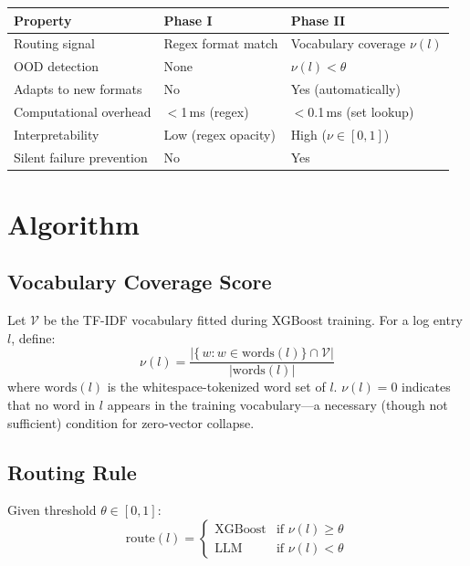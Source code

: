 \documentclass[11pt,conference]{IEEEtran}
\begin{document}
\begin{center}
\begin{tabular}{@{}lll@{}}
\toprule
\textbf{Property} & \textbf{Phase I} & \textbf{Phase II} \\
\midrule
Routing signal & Regex format match & Vocabulary coverage $\nu(l)$ \\
OOD detection & None & $\nu(l) < \theta$ \\
Adapts to new formats & No & Yes (automatically) \\
Computational overhead & $<$1\,ms (regex) & $<$0.1\,ms (set lookup) \\
Interpretability & Low (regex opacity) & High ($\nu \in [0,1]$) \\
Silent failure prevention & No & Yes \\
\bottomrule
\end{tabular}
\end{center}

\section{Algorithm}

\subsection{Vocabulary Coverage Score}

Let $\mathcal{V}$ be the TF-IDF vocabulary fitted during XGBoost training.
For a log entry $l$, define:
\begin{equation}
\nu(l) = \frac{|\{\,w : w \in \text{words}(l)\} \cap \mathcal{V}|}{|\text{words}(l)|}
\label{eq:vocab_cov}
\end{equation}
where $\text{words}(l)$ is the whitespace-tokenized word set of $l$.
$\nu(l) = 0$ indicates that no word in $l$ appears in the training
vocabulary---a necessary (though not sufficient) condition for zero-vector
collapse.

\subsection{Routing Rule}

Given threshold $\theta \in [0,1]$:
\begin{equation}
\text{route}(l) = \begin{cases}
\text{XGBoost} & \text{if } \nu(l) \geq \theta \\
\text{LLM} & \text{if } \nu(l) < \theta
\end{cases}
\label{eq:routing}
\end{equation}
\end{document}
